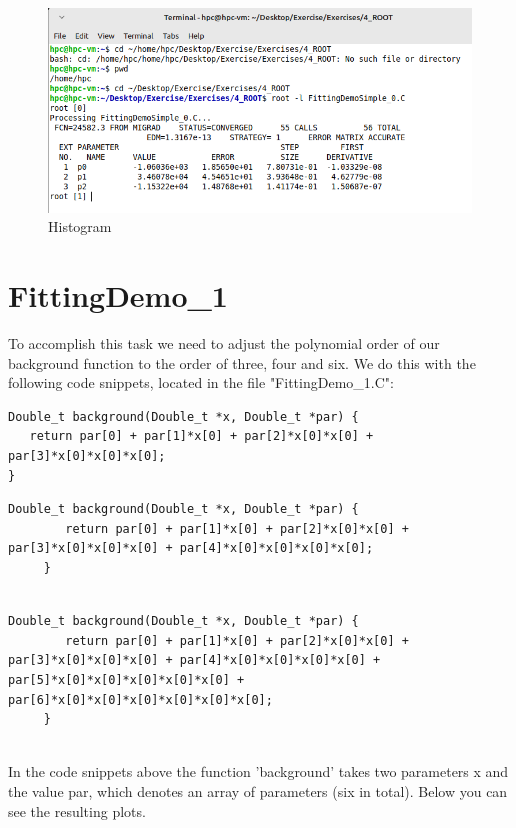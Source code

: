 \documentclass{article}
\begin{document}
 \begin{figure}[H]
    \centering
    \includegraphics[scale=0.3]{metrics.png} 
    \caption{Histogram}
    \label{fig:graph}
\end{figure}


\section*{FittingDemo\_1}
To accomplish this task we need to adjust the polynomial order of our background function
to the order of three, four and six. We do this with the following code snippets, located in the file
"FittingDemo\_1.C": \\[3mm]

\begin{lstlisting}[caption=Order 3]
    Double_t background(Double_t *x, Double_t *par) {
   return par[0] + par[1]*x[0] + par[2]*x[0]*x[0] + par[3]*x[0]*x[0]*x[0];
}

\end{lstlisting}
\begin{lstlisting}[caption=Order 4]
    Double_t background(Double_t *x, Double_t *par) {
        return par[0] + par[1]*x[0] + par[2]*x[0]*x[0] + par[3]*x[0]*x[0]*x[0] + par[4]*x[0]*x[0]*x[0]*x[0];
     }
     
\end{lstlisting}
\begin{lstlisting}[caption=Order 6]
    Double_t background(Double_t *x, Double_t *par) {
        return par[0] + par[1]*x[0] + par[2]*x[0]*x[0] + par[3]*x[0]*x[0]*x[0] + par[4]*x[0]*x[0]*x[0]*x[0] + par[5]*x[0]*x[0]*x[0]*x[0]*x[0] + par[6]*x[0]*x[0]*x[0]*x[0]*x[0]*x[0];
     }
     

\end{lstlisting}

In the code snippets above the function 'background' takes two parameters x and the value par, which denotes
an array of parameters (six in total).
Below you can see the resulting plots.
\end{document}
